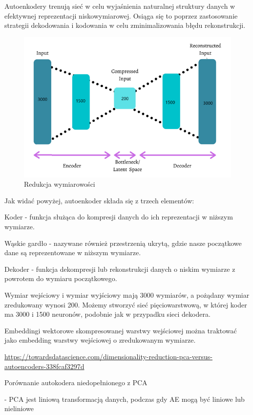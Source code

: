 \documentclass[12pt]{mwbk}
\theoremstyle{plain}
\theoremstyle{definition}
\theoremstyle{remark}
\newcommand\zrodlo[1]{\par\vspace{-3mm}{\small\textit{Źródło: }#1 }}
\begin{document}
Autoenkodery trenują sieć w celu wyjaśnienia naturalnej struktury danych w efektywnej reprezentacji niskowymiarowej. Osiąga się to poprzez zastosowanie strategii dekodowania i kodowania w celu zminimalizowania błędu rekonstrukcji.

\begin{figure}[!h]
	\centering
	\includegraphics[width=0.8\linewidth]{rys/dimensionality_reduction.png}
	\caption{Redukcja wymiarowości}
	\zrodlo{towards data science}
	\label{fig:dimensionality-reduction}
\end{figure}

Jak widać powyżej, autoenkoder składa się z trzech elementów:

Koder - funkcja służąca do kompresji danych do ich reprezentacji w niższym wymiarze.

Wąskie gardło - nazywane również przestrzenią ukrytą, gdzie nasze początkowe dane są reprezentowane w niższym wymiarze.

Dekoder - funkcja dekompresji lub rekonstrukcji danych o niskim wymiarze z powrotem do wymiaru początkowego.

Wymiar wejściowy i wymiar wyjściowy mają 3000 wymiarów, a pożądany wymiar zredukowany wynosi 200. Możemy stworzyć sieć pięciowarstwową, w której koder ma 3000 i 1500 neuronów, podobnie jak w przypadku sieci dekodera.

Embeddingi wektorowe skompresowanej warstwy wejściowej można traktować jako embedding warstwy wejściowej o zredukowanym wymiarze.


\url{https://towardsdatascience.com/dimensionality-reduction-pca-versus-autoencoders-338fcaf3297d}

Porównanie autokodera niedopełnionego z PCA

- PCA jest liniową transformacją danych, podczas gdy AE mogą być liniowe lub nieliniowe
\end{document}
